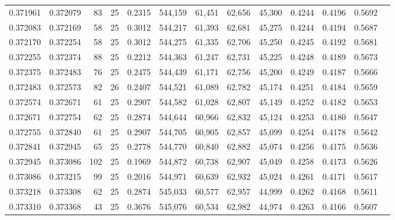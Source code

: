 \begin{tabular}{rrrrrrrrrrrrr}
0.371961 & 0.372079 &    83 &  25 &                                     0.2315 & 544,159 &  61,451 &  62,656 &  45,300 & 0.4244 & 0.4196 & 0.5692 \\
0.372083 & 0.372169 &    58 &  25 &                                     0.3012 & 544,217 &  61,393 &  62,681 &  45,275 & 0.4244 & 0.4194 & 0.5687 \\
0.372170 & 0.372254 &    58 &  25 &                                     0.3012 & 544,275 &  61,335 &  62,706 &  45,250 & 0.4245 & 0.4192 & 0.5681 \\
0.372255 & 0.372374 &    88 &  25 &                                     0.2212 & 544,363 &  61,247 &  62,731 &  45,225 & 0.4248 & 0.4189 & 0.5673 \\
0.372375 & 0.372483 &    76 &  25 &                                     0.2475 & 544,439 &  61,171 &  62,756 &  45,200 & 0.4249 & 0.4187 & 0.5666 \\
0.372483 & 0.372573 &    82 &  26 &                                     0.2407 & 544,521 &  61,089 &  62,782 &  45,174 & 0.4251 & 0.4184 & 0.5659 \\
0.372574 & 0.372671 &    61 &  25 &                                     0.2907 & 544,582 &  61,028 &  62,807 &  45,149 & 0.4252 & 0.4182 & 0.5653 \\
0.372671 & 0.372754 &    62 &  25 &                                     0.2874 & 544,644 &  60,966 &  62,832 &  45,124 & 0.4253 & 0.4180 & 0.5647 \\
0.372755 & 0.372840 &    61 &  25 &                                     0.2907 & 544,705 &  60,905 &  62,857 &  45,099 & 0.4254 & 0.4178 & 0.5642 \\
0.372841 & 0.372945 &    65 &  25 &                                     0.2778 & 544,770 &  60,840 &  62,882 &  45,074 & 0.4256 & 0.4175 & 0.5636 \\
0.372945 & 0.373086 &   102 &  25 &                                     0.1969 & 544,872 &  60,738 &  62,907 &  45,049 & 0.4258 & 0.4173 & 0.5626 \\
0.373086 & 0.373215 &    99 &  25 &                                     0.2016 & 544,971 &  60,639 &  62,932 &  45,024 & 0.4261 & 0.4171 & 0.5617 \\
0.373218 & 0.373308 &    62 &  25 &                                     0.2874 & 545,033 &  60,577 &  62,957 &  44,999 & 0.4262 & 0.4168 & 0.5611 \\
0.373310 & 0.373368 &    43 &  25 &                                     0.3676 & 545,076 &  60,534 &  62,982 &  44,974 & 0.4263 & 0.4166 & 0.5607 \\

\end{tabular}
